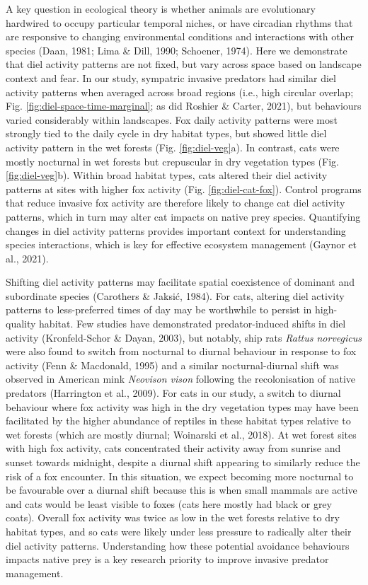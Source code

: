 \documentclass[]{elsarticle} %
\begin{document}
A key question in ecological theory is whether animals are evolutionary hardwired to occupy particular temporal niches, or have circadian rhythms that are responsive to changing environmental conditions and interactions with other species (Daan, 1981; Lima \& Dill, 1990; Schoener, 1974). Here we demonstrate that diel activity patterns are not fixed, but vary across space based on landscape context and fear. In our study, sympatric invasive predators had similar diel activity patterns when averaged across broad regions (i.e., high circular overlap; Fig. \ref{fig:diel-space-time-marginal}; as did Roshier \& Carter, 2021), but behaviours varied considerably within landscapes. Fox daily activity patterns were most strongly tied to the daily cycle in dry habitat types, but showed little diel activity pattern in the wet forests (Fig. \ref{fig:diel-veg}a). In contrast, cats were mostly nocturnal in wet forests but crepuscular in dry vegetation types (Fig. \ref{fig:diel-veg}b). Within broad habitat types, cats altered their diel activity patterns at sites with higher fox activity (Fig. \ref{fig:diel-cat-fox}). Control programs that reduce invasive fox activity are therefore likely to change cat diel activity patterns, which in turn may alter cat impacts on native prey species. Quantifying changes in diel activity patterns provides important context for understanding species interactions, which is key for effective ecosystem management (Gaynor et al., 2021).

Shifting diel activity patterns may facilitate spatial coexistence of dominant and subordinate species (Carothers \& Jaksić, 1984). For cats, altering diel activity patterns to less-preferred times of day may be worthwhile to persist in high-quality habitat. Few studies have demonstrated predator-induced shifts in diel activity (Kronfeld-Schor \& Dayan, 2003), but notably, ship rats \emph{Rattus norvegicus} were also found to switch from nocturnal to diurnal behaviour in response to fox activity (Fenn \& Macdonald, 1995) and a similar nocturnal-diurnal shift was observed in American mink \emph{Neovison vison} following the recolonisation of native predators (Harrington et al., 2009). For cats in our study, a switch to diurnal behaviour where fox activity was high in the dry vegetation types may have been facilitated by the higher abundance of reptiles in these habitat types relative to wet forests (which are mostly diurnal; Woinarski et al., 2018). At wet forest sites with high fox activity, cats concentrated their activity away from sunrise and sunset towards midnight, despite a diurnal shift appearing to similarly reduce the risk of a fox encounter. In this situation, we expect becoming more nocturnal to be favourable over a diurnal shift because this is when small mammals are active and cats would be least visible to foxes (cats here mostly had black or grey coats). Overall fox activity was twice as low in the wet forests relative to dry habitat types, and so cats were likely under less pressure to radically alter their diel activity patterns. Understanding how these potential avoidance behaviours impacts native prey is a key research priority to improve invasive predator management.
\end{document}
